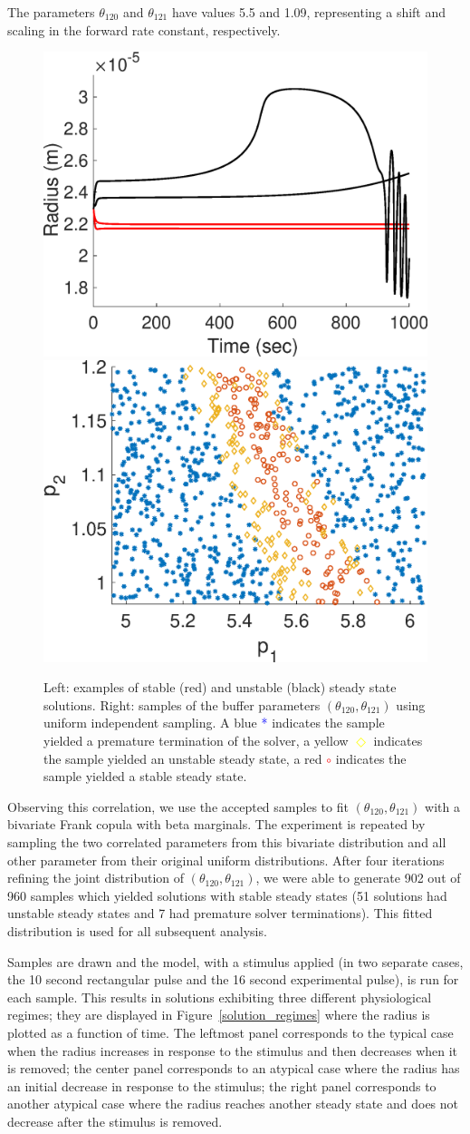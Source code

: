 The parameters $\theta_{120}$ and $\theta_{121}$ have values 5.5 and 1.09, representing a shift and scaling in the forward rate constant, respectively. 
\begin{figure}[h]
\centering
\includegraphics[width=.4 \textwidth]{Figures/Steady_State_Curves.eps}
\includegraphics[width=.4 \textwidth]{Figures/First_Iteration_Samples.eps}
\caption{Left: examples of stable (red) and unstable (black) steady state solutions. Right: samples of the buffer parameters $(\theta_{120},\theta_{121})$ using uniform independent sampling. A blue \textcolor{blue}{*} indicates the sample yielded a premature termination of the solver, a yellow \textcolor{yellow}{$\Diamond$} indicates the sample yielded an unstable steady state, a red \textcolor{red}{$\circ$} indicates the sample yielded a stable steady state.}
\label{steady_states}
\end{figure}

Observing this correlation, we use the accepted samples to fit $(\theta_{120},\theta_{121})$ with a bivariate Frank copula with beta marginals. The experiment is repeated by sampling the two correlated parameters from this bivariate distribution and all other parameter from their original uniform distributions. After four iterations refining the joint distribution of $(\theta_{120},\theta_{121})$, we were able to generate 902 out of 960 samples which yielded solutions with stable steady states (51 solutions had unstable steady states and 7 had premature solver terminations). This fitted distribution is used for all subsequent analysis. 

Samples are drawn and the model, with a stimulus applied (in two separate cases, the 10 second rectangular pulse and the 16 second experimental pulse), is run for each sample. This results in solutions exhibiting three different physiological regimes; they are displayed in Figure~\ref{solution_regimes} where the radius is plotted as a function of time. The leftmost panel corresponds to the typical case when the radius increases in response to the stimulus and then decreases when it is removed; the center panel corresponds to an atypical case where the radius has an initial decrease in response to the stimulus; the right panel corresponds to another atypical case where the radius reaches another steady state and does not decrease after the stimulus is removed.

